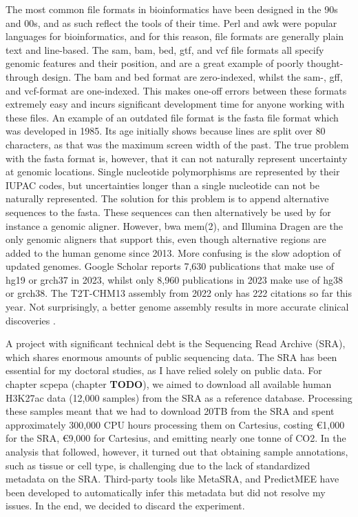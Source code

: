 The most common file formats in bioinformatics have been designed in the 90s and 00s, and as such reflect the tools of their time. Perl and awk were popular languages for bioinformatics, and for this reason, file formats are generally plain text and line-based. The sam, bam, bed, gtf, and vcf file formats all specify genomic features and their position, and are a great example of poorly thought-through design. The bam and bed format are zero-indexed\cite{Li2009}, whilst the sam-, gff, and vcf-format are one-indexed\cite{Li2009,Danecek2011}. This makes one-off errors between these formats extremely easy and incurs significant development time for anyone working with these files. An example of an outdated file format is the fasta file format which was developed in 1985\cite{Lipman1985}. Its age initially shows because lines are split over 80 characters, as that was the maximum screen width of the past. The true problem with the fasta format is, however, that it can not naturally represent uncertainty at genomic locations. Single nucleotide polymorphisms are represented by their IUPAC codes, but uncertainties longer than a single nucleotide can not be naturally represented. The solution for this problem is to append alternative sequences to the fasta. These sequences can then alternatively be used by for instance a genomic aligner. However, bwa mem(2)\cite{bwamem,bwamem2}, and Illumina Dragen are the only genomic aligners that support this, even though alternative regions are added to the human genome since 2013. More confusing is the slow adoption of updated genomes. Google Scholar reports 7,630 publications that make use of  hg19 or grch37 in 2023, whilst only 8,960 publications in 2023 make use of hg38 or grch38. The T2T-CHM13 assembly from 2022 only has 222 citations so far this year. Not surprisingly, a better genome assembly results in more accurate clinical discoveries \cite{Aganezov2022}.

A project with significant technical debt is the Sequencing Read Archive (SRA), which shares enormous amounts of public sequencing data. The SRA has been essential for my doctoral studies, as I have relied solely on public data. For chapter scpepa (chapter \textbf{TODO}), we aimed to download all available human H3K27ac data (12,000 samples) from the SRA as a reference database. Processing these samples meant that we had to download 20TB from the SRA and spent approximately 300,000 CPU hours processing them on Cartesius, costing €1,000 for the SRA\cite{amazon}, €9,000 for Cartesius, and emitting nearly one tonne of CO2\cite{CO2}. In the analysis that followed, however, it turned out that obtaining sample annotations, such as tissue or cell type, is challenging due to the lack of standardized metadata on the SRA. Third-party tools like MetaSRA\cite{Bernstein2017}, and PredictMEE\cite{Klie2021} have been developed to automatically infer this metadata but did not resolve my issues. In the end, we decided to discard the experiment. 

